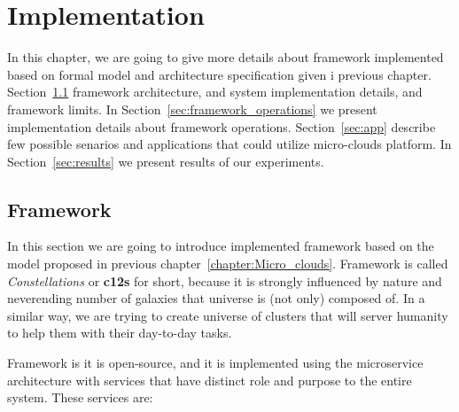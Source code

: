 \chapter{Implementation}\label{chapter:Implementation}
%
In this chapter, we are going to give more details about framework implemented based on formal model and architecture specification given i previous chapter.
Section~\ref{sec:framework} framework architecture, and system implementation details, and framework limits. In Section~\ref{sec:framework_operations} we present implementation details about framework operations. Section~\ref{sec:app} describe few possible senarios and applications that could utilize micro-clouds platform. In Section~\ref{sec:results} we present results of our experiments.
%
%
\section{Framework}\label{sec:framework}
%
In this section we are going to introduce implemented framework based on the model proposed in previous chapter~\ref{chapter:Micro_clouds}. Framework is called \textit{Constellations} or \textbf{c12s} for short, because it is strongly influenced by nature and neverending number of galaxies that universe is (not only) composed of. In a similar way, we are trying to create universe of clusters that will server humanity to help them with their day-to-day tasks.

Framework is it is open-source, and it is implemented using the microservice architecture with services that have distinct role and purpose to the entire system. These services are:

